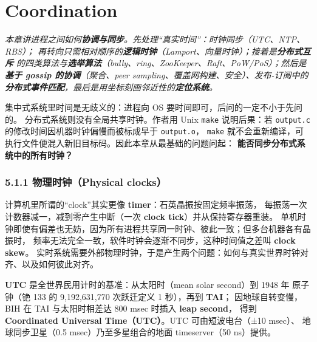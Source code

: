 \chapter{Coordination}
\begin{center}
\begin{minipage}{0.9\textwidth}
\itshape\small\color{dsgray}
本章讲进程之间如何\textbf{协调与同步}。先处理“真实时间”：时钟同步（UTC、NTP、RBS）；
再转向只需相对顺序的\textbf{逻辑时钟}（Lamport、向量时钟）；接着是\textbf{分布式互斥}
的四类算法与\textbf{选举算法}（bully、ring、ZooKeeper、Raft、PoW/PoS）；然后是
\textbf{基于 gossip 的协调}（聚合、peer sampling、覆盖网构建、安全）、发布-订阅中的
\textbf{分布式事件匹配}，最后是用坐标刻画邻近性的\textbf{定位系统}。
\end{minipage}
\end{center}


集中式系统里时间是无歧义的：进程向 OS 要时间即可，后问的一定不小于先问的。
分布式系统则没有全局共享时钟。作者用 Unix \texttt{make} 说明后果：若
\texttt{output.c} 的修改时间因机器时钟偏慢而被标成早于 \texttt{output.o}，
\texttt{make} 就不会重新编译，可执行文件便混入新旧目标码。因此本章从最基础的问题问起：
\textbf{能否同步分布式系统中的所有时钟？}

\subsection*{5.1.1 物理时钟（Physical clocks）}

计算机里所谓的“clock”其实更像 \textbf{timer}：石英晶振按固定频率振荡，
每振荡一次计数器减一，减到零产生中断（一次 \textbf{clock tick}）并从保持寄存器重装。
单机时钟即使有偏差也无妨，因为所有进程共享同一时钟、彼此一致；但多台机器各有晶振时，
频率无法完全一致，软件时钟会逐渐不同步，这种时间值之差叫 \textbf{clock skew}。
实时系统需要外部物理时钟，于是产生两个问题：如何与真实世界时钟对齐、以及如何彼此对齐。

\textbf{UTC} 是全世界民用计时的基准：从太阳时（mean solar second）到 1948 年
原子钟（铯 133 的 9,192,631,770 次跃迁定义 1 秒），再到 \textbf{TAI}；
因地球自转变慢，BIH 在 TAI 与太阳时相差达 800 msec 时插入 \textbf{leap second}，
得到 \textbf{Coordinated Universal Time（UTC）}。UTC 可由短波电台（±10 msec）、
地球同步卫星（0.5 msec）乃至多星组合的地面 timeserver（50 ns）提供。

